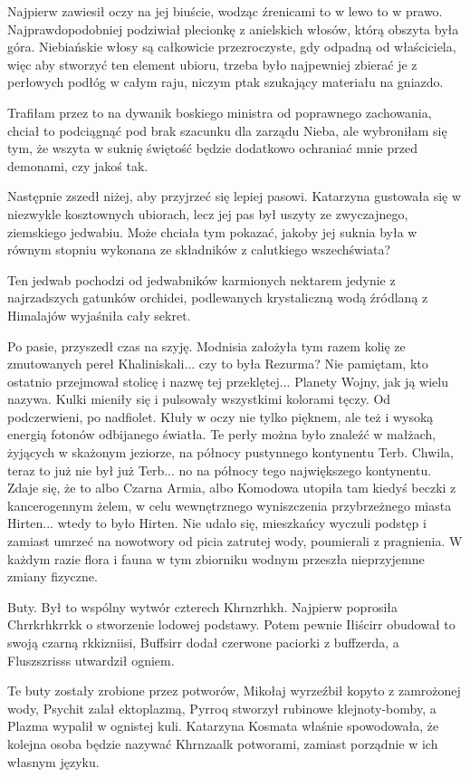 Najpierw zawiesił oczy na jej biuście, wodząc źrenicami to w lewo to w prawo.
Najprawdopodobniej podziwiał plecionkę z anielskich włosów, którą obszyta była góra.
Niebiańskie włosy są całkowicie przezroczyste, gdy odpadną od właściciela, więc
aby stworzyć ten element ubioru, trzeba było najpewniej zbierać je z perłowych podłóg w całym raju, niczym ptak szukający materiału na gniazdo.
\begin{dialogue}
\ds{} Trafiłam przez to na dywanik boskiego ministra od poprawnego zachowania, chciał to podciągnąć pod brak szacunku dla zarządu Nieba, ale wybroniłam się tym, że wszyta w suknię świętość
będzie dodatkowo ochraniać mnie przed demonami, czy jakoś tak.
\end{dialogue}

Następnie zszedł niżej, aby przyjrzeć się lepiej pasowi.
Katarzyna gustowała się w niezwykle kosztownych ubiorach, lecz jej pas był uszyty ze zwyczajnego, ziemskiego jedwabiu.
Może chciała tym pokazać, jakoby jej suknia była w równym stopniu wykonana ze składników z calutkiego wszechświata?
\begin{dialogue}
\ds{} Ten jedwab pochodzi od jedwabników karmionych nektarem jedynie z najrzadszych gatunków orchidei, podlewanych krystaliczną wodą źródlaną z Himalajów
\dm{} wyjaśniła cały sekret.
\end{dialogue}

Po pasie, przyszedł czas na szyję. Modnisia założyła tym razem kolię ze zmutowanych pereł Khaliniskali...
czy to była Rezurma? Nie pamiętam, kto ostatnio przejmował stolicę i nazwę tej przeklętej... Planety Wojny, jak ją wielu nazywa.
Kulki mieniły się i pulsowały wszystkimi kolorami tęczy. Od podczerwieni, po nadfiolet. Kłuły w oczy nie tylko pięknem, ale też i wysoką energią fotonów odbijanego światła.
Te perły można było znaleźć w małżach, żyjących w skażonym jeziorze, na północy pustynnego kontynentu Terb. Chwila, teraz to już nie był już Terb... no na północy tego największego kontynentu.
Zdaje się, że to albo Czarna Armia, albo Komodowa utopiła tam kiedyś beczki z kancerogennym żelem, w celu wewnętrznego wyniszczenia przybrzeżnego miasta Hirten... wtedy to było Hirten.
Nie udało się, mieszkańcy wyczuli podstęp i zamiast umrzeć na nowotwory od picia zatrutej wody, poumierali z pragnienia.
W każdym razie flora i fauna w tym zbiorniku wodnym przeszła nieprzyjemne zmiany fizyczne.

Buty. Był to wspólny wytwór czterech Khrnzrhkh.
Najpierw poprosiła Chrrkrhkrrkk o stworzenie lodowej podstawy.
Potem pewnie Iłiścirr obudował to swoją czarną rkkizniisi, Buffsirr dodał czerwone paciorki z buffzerda, a Fluszszrisss utwardził ogniem.
\begin{dialogue}
\ds{} Te buty zostały zrobione przez potworów, Mikołaj wyrzeźbił kopyto z zamrożonej wody, 
Psychit zalał ektoplazmą, Pyrroq stworzył rubinowe klejnoty-bomby, a Plazma wypalił w ognistej kuli. \dm{}
Katarzyna Kosmata właśnie spowodowała, że kolejna osoba będzie nazywać Khrnzaalk potworami, zamiast porządnie w ich własnym języku.
\end{dialogue}

